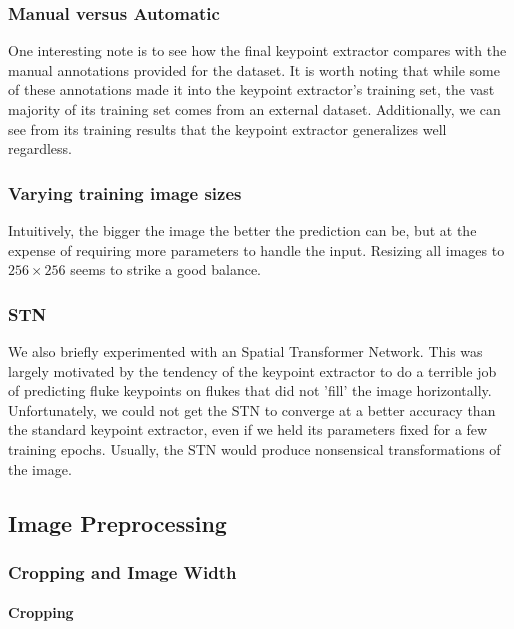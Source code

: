 \subsubsection{Manual versus Automatic}

One interesting note is to see how the final keypoint extractor compares with the manual annotations provided for the dataset.
It is worth noting that while some of these annotations made it into the keypoint extractor's training set, the vast majority of its training set comes from an external dataset.
Additionally, we can see from its training results that the keypoint extractor generalizes well regardless.

\subsubsection{Varying training image sizes}

Intuitively, the bigger the image the better the prediction can be, but at the expense of requiring more parameters to handle the input.
Resizing all images to $256 \times 256$ seems to strike a good balance.

\subsubsection{STN} %

We also briefly experimented with an Spatial Transformer Network.
This was largely motivated by the tendency of the keypoint extractor to do a terrible job of predicting fluke keypoints on flukes that did not 'fill' the image horizontally.
Unfortunately, we could not get the STN to converge at a better accuracy than the standard keypoint extractor, even if we held its parameters fixed for a few training epochs.
Usually, the STN would produce nonsensical transformations of the image.


\subsection{Image Preprocessing}

\subsubsection{Cropping and Image Width}

\paragraph{Cropping}


